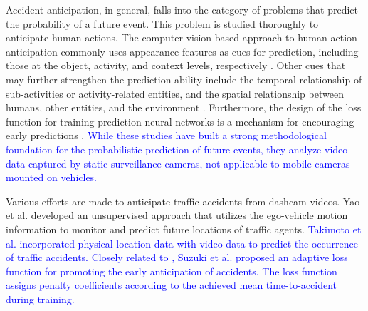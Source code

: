 \documentclass[journal]{IEEEtran}
\begin{document}
Accident anticipation, in general, falls into the category of problems that predict the probability of a future event. This problem is studied thoroughly to anticipate human actions. The computer vision-based approach to human action anticipation commonly uses appearance features as cues for prediction, including those at the object, activity, and context levels, respectively \cite{koppula2015anticipating,vondrick2016anticipating,minguez2018pedestrian,xu2019temporal,liang2019peeking}. Other cues that may further strengthen the prediction ability include the temporal relationship of sub-activities or activity-related entities, and the spatial relationship between humans, other entities, and the environment \cite{li2021crash}. Furthermore, the design of the loss function for training prediction neural networks is a mechanism for encouraging early predictions \cite{sadegh2017encouraging}. \textcolor{blue}{While these studies have built a strong methodological foundation for the probabilistic prediction of future events, they analyze video data captured by static surveillance cameras, not applicable to mobile cameras mounted on vehicles.} 

Various efforts are made to anticipate traffic accidents from dashcam videos. Yao et al. \cite{yao2019unsupervised} developed an unsupervised approach that utilizes the ego-vehicle motion information to monitor and predict future locations of traffic agents. \textcolor{blue}{Takimoto et al. \cite{takimoto2019predicting} incorporated physical location data with video data to predict the occurrence of traffic accidents. Closely related to \cite{ma2016learning, sadegh2017encouraging}, Suzuki et al. \cite{suzuki2018anticipating} proposed an adaptive loss function for promoting the early anticipation of accidents. The loss function assigns penalty coefficients according to the achieved mean time-to-accident during training.}
\end{document}
